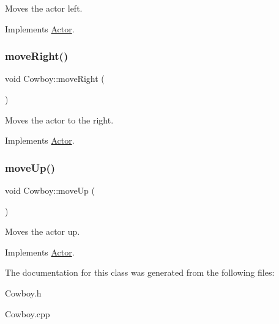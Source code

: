 Moves the actor left. 



Implements \mbox{\hyperlink{classActor_a522d6069bacaa9985db7a234bde2c8b6}{Actor}}.

\mbox{\label{classCowboy_a2094d31b2535a25ef8a40945473cf884}} 
\subsubsection{\texorpdfstring{moveRight()}{moveRight()}}
{\footnotesize\ttfamily void Cowboy\+::move\+Right (\begin{DoxyParamCaption}{ }\end{DoxyParamCaption})\hspace{0.3cm}{\ttfamily [virtual]}}



Moves the actor to the right. 



Implements \mbox{\hyperlink{classActor_a9176d8f8ec68fcbd91c48223e7c65775}{Actor}}.

\mbox{\label{classCowboy_a3c4b0540c47492d02fa64b4740a35bcf}} 
\subsubsection{\texorpdfstring{moveUp()}{moveUp()}}
{\footnotesize\ttfamily void Cowboy\+::move\+Up (\begin{DoxyParamCaption}{ }\end{DoxyParamCaption})\hspace{0.3cm}{\ttfamily [virtual]}}



Moves the actor up. 



Implements \mbox{\hyperlink{classActor_afaa299f90233461ee4df96dcfda3008a}{Actor}}.



The documentation for this class was generated from the following files\+:\begin{DoxyCompactItemize}
\item 
Cowboy.\+h\item 
Cowboy.\+cpp\end{DoxyCompactItemize}
